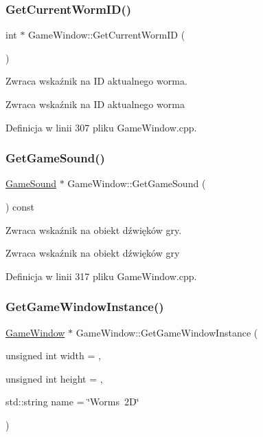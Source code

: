 \subsubsection{\texorpdfstring{Get\+Current\+Worm\+I\+D()}{GetCurrentWormID()}}
{\footnotesize\ttfamily int $\ast$ Game\+Window\+::\+Get\+Current\+Worm\+ID (\begin{DoxyParamCaption}{ }\end{DoxyParamCaption})}



Zwraca wskaźnik na ID aktualnego worma. 

\begin{DoxyReturn}{Zwraca}
wskaźnik na ID aktualnego worma 
\end{DoxyReturn}


Definicja w linii 307 pliku Game\+Window.\+cpp.

\mbox{\label{class_game_window_aa3280056f0018da1eee85ccb1e5fd2ac}} 
\subsubsection{\texorpdfstring{Get\+Game\+Sound()}{GetGameSound()}}
{\footnotesize\ttfamily \mbox{\hyperlink{class_game_sound}{Game\+Sound}} $\ast$ Game\+Window\+::\+Get\+Game\+Sound (\begin{DoxyParamCaption}{ }\end{DoxyParamCaption}) const}



Zwraca wskaźnik na obiekt dźwięków gry. 

\begin{DoxyReturn}{Zwraca}
wskaźnik na obiekt dźwięków gry 
\end{DoxyReturn}


Definicja w linii 317 pliku Game\+Window.\+cpp.

\mbox{\label{class_game_window_a9c480a3795bfd6d22a9dc8a3bae47b1b}} 
\subsubsection{\texorpdfstring{Get\+Game\+Window\+Instance()}{GetGameWindowInstance()}}
{\footnotesize\ttfamily \mbox{\hyperlink{class_game_window}{Game\+Window}} $\ast$ Game\+Window\+::\+Get\+Game\+Window\+Instance (\begin{DoxyParamCaption}\item[{unsigned int}]{width = {},  }\item[{unsigned int}]{height = {},  }\item[{std\+::string}]{name = {\ttfamily \char`\"{}Worms~2D\char`\"{}} }\end{DoxyParamCaption})\hspace{0.3cm}{\ttfamily [static]}}



